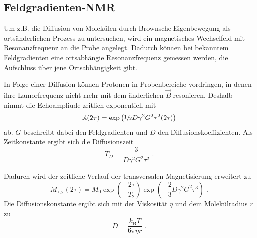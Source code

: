 \subsection{Feldgradienten-NMR}

Um z.B. die Diffusion von Molekülen durch Brownsche Eigenbewegung als ortsänderlichen Prozess zu untersuchen, 
wird ein magnetisches Wechselfeld mit Resonanzfrequenz an die Probe angelegt. Dadurch 
können bei bekanntem Feldgradienten eine ortsabhängie Resonanzfrequenz gemessen werden, die 
Aufschluss über jene Ortsabhängigkeit gibt.

In Folge einer Diffusion können Protonen in Probenbereiche vordringen, in denen ihre Lamorfrequenz nicht mehr
mit dem änderlichen $\vec{B}$ resonieren. Deshalb nimmt die Echoampliude zeitlich exponentiell mit
\begin{equation}
    A(2\tau) = \text{exp}\left(\sfrac{1}{3}D \gamma^2 G^2 \tau^2 (2\tau) \right)
\end{equation}
ab. $G$ beschreibt dabei den Feldgradienten und $D$ den Diffusionskoeffizienten. Als Zeitkonstante
ergibt sich die Diffusionszeit 
\begin{equation}
    T_D = \frac{3}{D \gamma^2 G^2 \tau^2} \; .
\end{equation}

Dadurch wird der zeitliche Verlauf der transversalen Magnetisierung erweitert zu 
\begin{equation}
    M_\text{x,y} \left(2\tau\right) = M_0 \exp{\left(-\frac{2\tau}{T_2}\right)} \exp{\left(-\frac{2}{3}D\gamma^2G^2\tau^3\right)} \; .
    \label{eqn:DK}
\end{equation}
Die Diffusionskonstante ergibt sich mit der Viskosität $\eta$ und dem Molekülradius $r$ zu
\begin{equation}
    D = \frac{k_\text{B}T}{6\pi \eta r} \; .
\end{equation}
